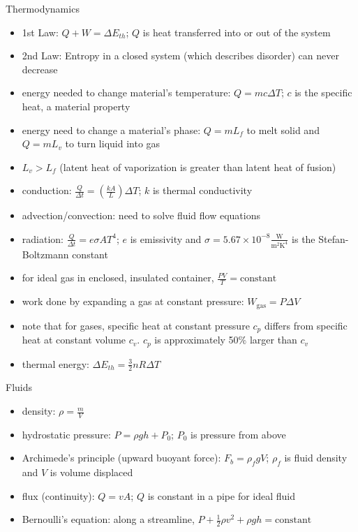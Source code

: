 \documentclass[11pt,letterpaper]{article}
\begin{document}
Thermodynamics
\begin{itemize}
\item 1st Law: $Q+W=\Delta{E_{th}}$; $Q$ is heat transferred into or out of the system
\item 2nd Law: Entropy in a closed system (which describes disorder) can never decrease
\item energy needed to change material's temperature: $Q=mc\Delta{T}$; $c$ is the specific heat, a material property
\item energy need to change a material's phase: $Q=mL_f$ to melt solid and $Q=mL_v$ to turn liquid into gas
\item $L_v>L_f$ (latent heat of vaporization is greater than latent heat of fusion)
\item conduction: $\frac{Q}{\Delta{t}}=\left(\frac{kA}{L}\right)\Delta{T}$; $k$ is thermal conductivity
\item advection/convection: need to solve fluid flow equations
\item radiation: $\frac{Q}{\Delta{t}}=e\sigma{A}T^4$; $e$ is emissivity and $\sigma=5.67\times{10}^{-8}\frac{\mbox{W}}{\mbox{m}^2\mbox{K}^4}$ is the Stefan-Boltzmann constant
\item for ideal gas in enclosed, insulated container, $\frac{PV}{T}=\mbox{constant}$
\item work done by expanding a gas at constant pressure: $W_{\mathrm{gas}}=P\Delta{V}$
\item note that for gases, specific heat at constant pressure $c_p$ differs from specific heat at constant volume $c_v$. $c_p$ is approximately 50$\%$ larger than $c_v$
\item thermal energy: $\displaystyle\Delta E_{th} = \frac{3}{2}nR\Delta T$
\end{itemize}

\clearpage
Fluids
\begin{itemize}
\item density: $\rho=\frac{m}{V}$
\item hydrostatic pressure: $P=\rho{g}h+P_0$; $P_0$ is pressure from above
\item Archimede's principle (upward buoyant force): $F_b=\rho_f{g}V$; $\rho_f$ is fluid density and $V$ is volume displaced
\item flux (continuity): $Q=vA$; $Q$ is constant in a pipe for ideal fluid
\item Bernoulli's equation: along a streamline, $P+\frac{1}{2}\rho{v^2}+\rho{g}h=\mathrm{constant}$
\end{itemize}
\end{document}
